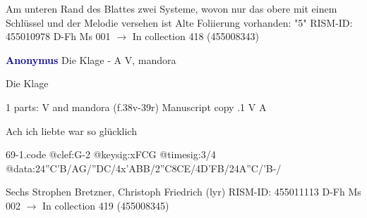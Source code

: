 \documentclass[twocolumn]{book}
\begin{document}
\newline Am unteren Rand des Blattes zwei Systeme, wovon nur das obere mit einem Schlüssel und der Melodie versehen ist
\newline Alte Foliierung vorhanden: "5"
\newline RISM-ID: 455010978
\newline D-Fh  Ms 001
\newline $\rightarrow$ In collection 418 (455008343)
      
\newline \par \vspace{7pt} \textcolor{darkblue}{\textbf{Anonymus  }}
\newline Die Klage - A
\newline V, mandora
\newline \begin{itshape}[heading, f.38v:] Die Klage\end{itshape} 
\newline \textcolor{darkblue}{}  1 parts: V and mandora  (f.38v-39r)
\newline Manuscript copy
.1  V  A
\newline \begin{footnotesize} Ach ich liebte war so glücklich \end{footnotesize}  
\begin{filecontents*}{69-1.code}
@clef:G-2
@keysig:xFCG
@timesig:3/4
@data:24''C'B/AG/''DC/4x'ABB/2''C{8CE}/4D'FB/24A''C/'B-/
\end{filecontents*}
\newline
%

\newline Sechs Strophen
\newline Bretzner, Christoph Friedrich  (lyr)
\newline RISM-ID: 455011113
\newline D-Fh  Ms 002
\newline $\rightarrow$ In collection 419 (455008345)
      
\end{document}
